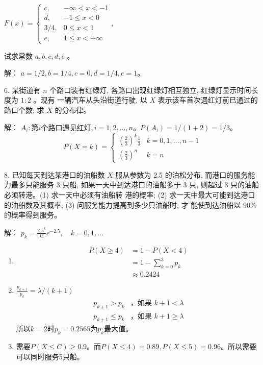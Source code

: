 \documentclass[14pt]{scrartcl} %
\numberwithin{equation}{section} %
\numberwithin{figure}{section} %
\numberwithin{table}{section} %
\begin{document}
	$F(x)=\left\{\begin{array}{cc}c, & -\infty<x<-1 \\ d, & -1 \leqslant x<0 \\ 3 / 4, & 0 \leqslant x<1 \\ e, & 1 \leqslant x<+\infty\end{array}\right.$,
	
	试求常数 $a, b, c, d, e$ 。
	
	\vspace*{1cm}
	解：
	$a = 1 / 2, b = 1 / 4, c = 0, d = 1 / 4, e = 1$。
	
	6. 某街道有 $n$ 个路口装有红绿灯, 各路口出现红绿灯相互独立, 红绿灯显示时间长度为 $1: 2$ 。现有 一辆汽车从头沿街道行驶, 以 $X$ 表示该车首次遇红灯前已通过的路口个数; 求 $X$ 的分布律。
	
	\vspace*{1cm}
	解：
	$A_i:\text{第}i\text{个路口遇见红灯}, i = 1, 2, \dots, n$。$P(A_i) = 1 / (1 + 2) = 1 / 3$。
	\[
	P(X = k) = \left\{
	\begin{array}{cl}
		(\frac{2}{3}) ^ k \frac{1}{3} & k = 0, 1, \dots, n - 1 \\
		(\frac{2}{3}) ^ n & k = n
	\end{array}\right.
	\]
	
	8. 已知每天到达某港口的油船数 $X$ 服从参数为 2.5 的泊松分布, 而港口的服务能力最多只能服务 3 只船, 如果一天中到达港口的油船多于 3 只, 则超过 3 只的油船必须转港。(1) 求一天中必须有油船转 港的概率; (2) 求一天中最大可能到达港口的油船数及其概率; (3) 问服务能力提高到多少只油船时, 才 能使到达油船以 $90 \%$ 的概率得到服务。
	
	\vspace*{1cm}
	解：
	$p_k = \frac{2.5 ^ k}{k!} e ^ {-2.5}, \quad k = 0, 1, \dots$
	\begin{enumerate}[(1)]
		\item \begin{align}
			P(X \geq 4) & = 1 - P( X < 4) \\
			& = 1 - \sum_{k = 0}^{3}p_k \\
			& \approx 0.2424
		\end{align}
		\item $\frac{p_{k + 1}}{p_k} = \lambda / (k + 1)$
		\begin{align}
			p_{k + 1} > p_k & \text{，如果 }k + 1  < \lambda \\
			p_{k + 1} \leq p_k & \text{，如果 }k + 1 \geq \lambda
		\end{align}
		所以$k = 2$时$p_k = 0.2565$为$p_k$最大值。
		\item 需要$P(X \leq C) \geq 0.9$。而$P(X \leq 4) =0.89, P(X \leq 5) = 0.96$。所以需要可以同时服务5只船。
	\end{enumerate}
\end{document}
